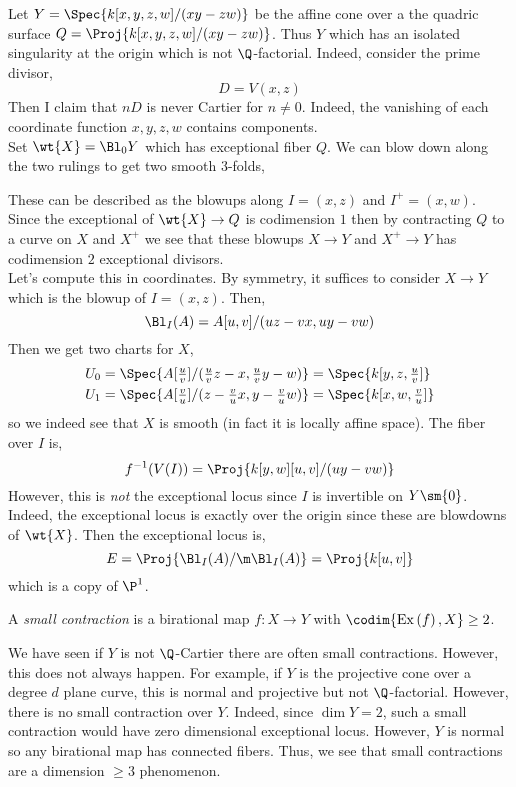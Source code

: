 \documentclass[12pt]{article}
\begin{document}
\begin{example}
Let $Y = \Spec{k[x,y,z,w]/(xy - zw)}$ be the affine cone over a the quadric surface $Q = \Proj{k[x,y,z,w]/(xy - zw)}$. Thus $Y$ which has an isolated singularity at the origin which is not $\Q$-factorial. Indeed, consider the prime divisor,
\[ D = V(x,z) \]
Then I claim that $n D$ is never Cartier for $n \neq 0$. Indeed, the vanishing of each coordinate function $x,y,z,w$ contains components.
\bigskip\\
Set $\wt{X} = \Bl_0 Y$ which has exceptional fiber $Q$. We can blow down along the two rulings to get two smooth $3$-folds,
\begin{center}
\end{center}
These can be described as the blowups along $I = (x,z)$ and $I^+ = (x,w)$. Since the exceptional of $\wt{X} \to Q$ is codimension $1$ then by contracting $Q$ to a curve on $X$ and $X^+$ we see that these blowups $X \to Y$ and $X^+ \to Y$ has codimension $2$ exceptional divisors.
\bigskip\\
Let's compute this in coordinates. By symmetry, it suffices to consider $X \to Y$ which is the blowup of $I = (x, z)$. Then,
\[ \Bl_I(A) = A[u,v]/(uz - vx, uy - vw) \]
Then we get two charts for $X$,
\begin{align*}
U_0 &= \Spec{A[\tfrac{u}{v}]/(\tfrac{u}{v} z - x, \tfrac{u}{v} y - w)} = \Spec{k[y,z,\tfrac{u}{v}]} \\
U_1 &= \Spec{A[\tfrac{v}{u}]/(z - \tfrac{v}{u} x, y - \tfrac{v}{u} w)} = \Spec{k[x,w,\tfrac{v}{u}]}
\end{align*}
so we indeed see that $X$ is smooth (in fact it is locally affine space). The fiber over $I$ is,
\[ f^{-1}(V(I)) = \Proj{k[y,w][u,v]/(uy - vw)} \]
However, this is \textit{not} the exceptional locus since $I$ is invertible on $Y \sm \{ 0 \}$. Indeed, the exceptional locus is exactly over the origin since these are blowdowns of $\wt{X}$. Then the exceptional locus is,
\[ E = \Proj{\Bl_I(A) / \m \Bl_I(A)} = \Proj{k[u,v]} \]
which is a copy of $\P^1$. 
\end{example}

\begin{defn}
A \textit{small contraction} is a birational map $f : X \to Y$ with $\codim{\Ex{f}, X} \ge 2$.
\end{defn}

\begin{rmk}
We have seen if $Y$ is not $\Q$-Cartier there are often small contractions. However, this does not always happen. For example, if $Y$ is the projective cone over a degree $d$ plane curve, this is normal and projective but not $\Q$-factorial. However, there is no small contraction over $Y$. Indeed, since $\dim{Y} = 2$, such a small contraction would have zero dimensional exceptional locus. However, $Y$ is normal so any birational map has connected fibers. Thus, we see that small contractions are a dimension $\ge 3$ phenomenon. 
\end{rmk}
\end{document}
